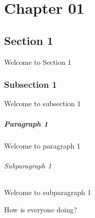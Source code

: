 \documentclass{report}
\begin{document}
	\chapter{Chapter 01}
	
	\section{Section 1}
	
	Welcome to Section 1
	
	\subsection{Subsection 1}
	
	Welcome to subsection 1
	
	\paragraph{Paragraph 1}
	
	Welcome to paragraph 1
	
	\subparagraph{Subparagraph 1}
	
	Welcome to subparagraph 1
	
	How is everyone doing?
	
	
\end{document}
